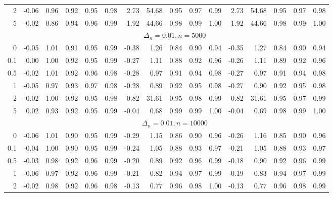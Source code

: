\documentclass{article}
\theoremstyle{plain}
\theoremstyle{definition}
\theoremstyle{remark}
\begin{document}
\begin{appendix}
{\begin{table}[ht]
\begin{tabular}{r|rrrrr|rrrrr|rrrrr}
  2 & -0.06 & 0.96 & 0.92 & 0.95 & 0.98 & 2.73 & 54.68 & 0.95 & 0.97 & 0.99 & 2.73 & 54.68 & 0.95 & 0.97 & 0.98 \\ 
  5 & -0.02 & 0.86 & 0.94 & 0.96 & 0.99 & 1.92 & 44.66 & 0.98 & 0.99 & 1.00 & 1.92 & 44.66 & 0.98 & 0.99 & 1.00 \\ 
   \midrule
   &\multicolumn{15}{c}{$\Delta_n=0.01, n= 5000$}
   \\
0 & -0.05 & 1.01 & 0.91 & 0.95 & 0.99 & -0.38 & 1.26 & 0.84 & 0.90 & 0.94 & -0.35 & 1.27 & 0.84 & 0.90 & 0.94 \\ 
  0.1 & 0.00 & 1.00 & 0.92 & 0.95 & 0.99 & -0.27 & 1.11 & 0.88 & 0.92 & 0.96 & -0.26 & 1.11 & 0.89 & 0.92 & 0.96 \\ 
  0.5 & -0.02 & 1.01 & 0.92 & 0.96 & 0.98 & -0.28 & 0.97 & 0.91 & 0.94 & 0.98 & -0.27 & 0.97 & 0.91 & 0.94 & 0.98 \\ 
  1 & -0.05 & 0.97 & 0.93 & 0.97 & 0.98 & -0.28 & 0.89 & 0.92 & 0.95 & 0.98 & -0.27 & 0.90 & 0.92 & 0.95 & 0.98 \\ 
  2 & -0.02 & 1.00 & 0.92 & 0.95 & 0.98 & 0.82 & 31.61 & 0.95 & 0.98 & 0.99 & 0.82 & 31.61 & 0.95 & 0.97 & 0.99 \\ 
  5 & 0.02 & 0.93 & 0.92 & 0.95 & 0.99 & -0.04 & 0.68 & 0.99 & 0.99 & 1.00 & -0.04 & 0.69 & 0.98 & 0.99 & 1.00 \\ 
   \midrule
   &\multicolumn{15}{c}{$\Delta_n=0.01, n= 10000$}
   \\
 0 & -0.06 & 1.01 & 0.90 & 0.95 & 0.99 & -0.29 & 1.15 & 0.86 & 0.90 & 0.96 & -0.26 & 1.16 & 0.85 & 0.90 & 0.96 \\ 
  0.1 & -0.04 & 1.00 & 0.90 & 0.95 & 0.99 & -0.24 & 1.05 & 0.88 & 0.93 & 0.97 & -0.21 & 1.05 & 0.88 & 0.93 & 0.97 \\ 
  0.5 & -0.03 & 0.98 & 0.92 & 0.96 & 0.99 & -0.20 & 0.89 & 0.92 & 0.96 & 0.99 & -0.18 & 0.90 & 0.92 & 0.96 & 0.99 \\ 
  1 & -0.06 & 0.97 & 0.92 & 0.96 & 0.99 & -0.21 & 0.82 & 0.94 & 0.97 & 0.99 & -0.19 & 0.83 & 0.94 & 0.97 & 0.99 \\ 
  2 & -0.02 & 0.98 & 0.92 & 0.96 & 0.98 & -0.13 & 0.77 & 0.96 & 0.98 & 1.00 & -0.13 & 0.77 & 0.96 & 0.98 & 0.99 \\ 

\end{tabular}
\end{table}}
\end{appendix}
\end{document}
